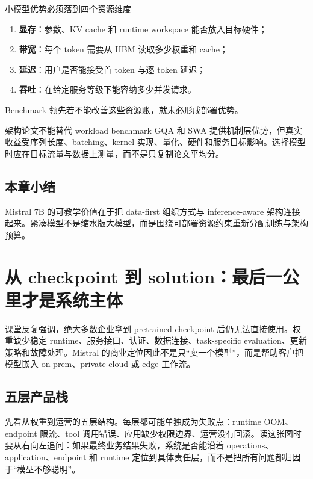 \documentclass[a4paper]{article}
\begin{document}
\begin{importantbox}{小模型优势必须落到四个资源维度}
\begin{enumerate}
  \item \textbf{显存}：参数、KV cache 和 runtime workspace 能否放入目标硬件；
  \item \textbf{带宽}：每个 token 需要从 HBM 读取多少权重和 cache；
  \item \textbf{延迟}：用户是否能接受首 token 与逐 token 延迟；
  \item \textbf{吞吐}：在给定服务等级下能容纳多少并发请求。
\end{enumerate}
Benchmark 领先若不能改善这些资源账，就未必形成部署优势。
\end{importantbox}

\begin{warningbox}{架构论文不能替代 workload benchmark}
GQA 和 SWA 提供机制层优势，但真实收益受序列长度、batching、kernel 实现、量化、硬件和服务目标影响。选择模型时应在目标流量与数据上测量，而不是只复制论文平均分。
\end{warningbox}

\subsection{本章小结}

Mistral 7B 的可教学价值在于把 data-first 组织方式与 inference-aware 架构连接起来。紧凑模型不是缩水版大模型，而是围绕可部署资源约束重新分配训练与架构预算。

\section{从 checkpoint 到 solution：最后一公里才是系统主体}

课堂反复强调，绝大多数企业拿到 pretrained checkpoint 后仍无法直接使用。权重缺少稳定 runtime、服务接口、认证、数据连接、task-specific evaluation、更新策略和故障处理。Mistral 的商业定位因此不是只“卖一个模型”，而是帮助客户把模型嵌入 on-prem、private cloud 或 edge 工作流。

\subsection{五层产品栈}

先看从权重到运营的五层结构。每层都可能单独成为失败点：runtime OOM、endpoint 限流、tool 调用错误、应用缺少权限边界、运营没有回滚。读这张图时要从右向左追问：如果最终业务结果失败，系统是否能沿着 operations、application、endpoint 和 runtime 定位到具体责任层，而不是把所有问题都归因于“模型不够聪明”。
\end{document}
